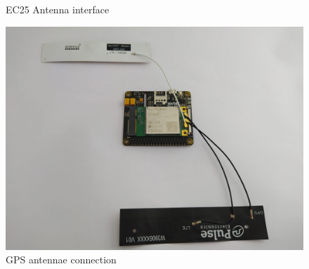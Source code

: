 \documentclass[12pt, letterpaper]{article}
\begin{document}
\begin{enumerate}[label=\large{\textbf{\arabic*}.}]
\begin{itemize}
\begin{figure}[h!]
	\caption{EC25 Antenna interface}
	\end{figure}	
	\begin{figure}[h!]
	\centering
	\includegraphics[width=1\columnwidth]{assets/Raspberry-Pi-Base-HAT-Quectel-Getting-Started-2-scaled.jpg}
	\caption{GPS antennae connection}
	\end{figure}	
	

\end{itemize}
\end{enumerate}
\end{document}
